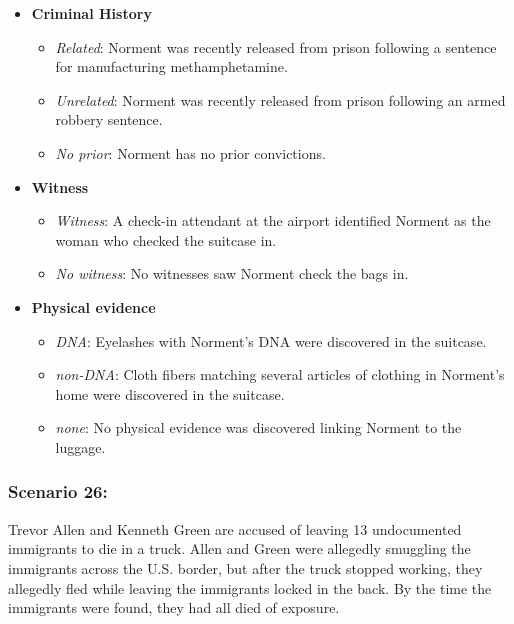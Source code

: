 \documentclass[
]{article}
\providecommand{\tightlist}{%
  \setlength{\itemsep}{0pt}\setlength{\parskip}{0pt}}
\begin{document}
\begin{itemize}
\tightlist
\item
  \textbf{Criminal History}

  \begin{itemize}
  \tightlist
  \item
    \emph{Related}: Norment was recently released from prison following
    a sentence for manufacturing methamphetamine.
  \item
    \emph{Unrelated}: Norment was recently released from prison
    following an armed robbery sentence.
  \item
    \emph{No prior}: Norment has no prior convictions.
  \end{itemize}
\item
  \textbf{Witness}

  \begin{itemize}
  \tightlist
  \item
    \emph{Witness}: A check-in attendant at the airport identified
    Norment as the woman who checked the suitcase in.
  \item
    \emph{No witness}: No witnesses saw Norment check the bags in.
  \end{itemize}
\item
  \textbf{Physical evidence}

  \begin{itemize}
  \tightlist
  \item
    \emph{DNA}: Eyelashes with Norment's DNA were discovered in the
    suitcase.
  \item
    \emph{non-DNA}: Cloth fibers matching several articles of clothing
    in Norment's home were discovered in the suitcase.
  \item
    \emph{none}: No physical evidence was discovered linking Norment to
    the luggage.
  \end{itemize}
\end{itemize}

\hypertarget{scenario-26}{%
\subsubsection{Scenario 26:}\label{scenario-26}}

Trevor Allen and Kenneth Green are accused of leaving 13 undocumented
immigrants to die in a truck. Allen and Green were allegedly smuggling
the immigrants across the U.S. border, but after the truck stopped
working, they allegedly fled while leaving the immigrants locked in the
back. By the time the immigrants were found, they had all died of
exposure.
\end{document}
